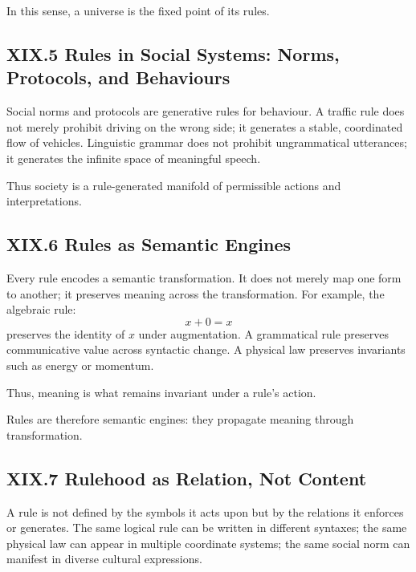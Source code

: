 \documentclass[12pt,letterpaper]{article}
\begin{document}
In this sense, a universe is the fixed point of its rules.

\subsection{XIX.5 Rules in Social Systems: Norms, Protocols, and Behaviours}

Social norms and protocols are generative rules for behaviour. A traffic rule does not merely prohibit driving on the wrong side; it generates a stable, coordinated flow of vehicles. Linguistic grammar does not prohibit ungrammatical utterances; it generates the infinite space of meaningful speech.

Thus society is a rule-generated manifold of permissible actions and interpretations.

\subsection{XIX.6 Rules as Semantic Engines}

Every rule encodes a semantic transformation. It does not merely map one form to another; it preserves meaning across the transformation. For example, the algebraic rule:
\[
x + 0 = x
\]
preserves the identity of \(x\) under augmentation. A grammatical rule preserves communicative value across syntactic change. A physical law preserves invariants such as energy or momentum.

Thus, meaning is what remains invariant under a rule’s action.

Rules are therefore semantic engines: they propagate meaning through transformation.

\subsection{XIX.7 Rulehood as Relation, Not Content}

A rule is not defined by the symbols it acts upon but by the relations it enforces or generates. The same logical rule can be written in different syntaxes; the same physical law can appear in multiple coordinate systems; the same social norm can manifest in diverse cultural expressions.
\end{document}
